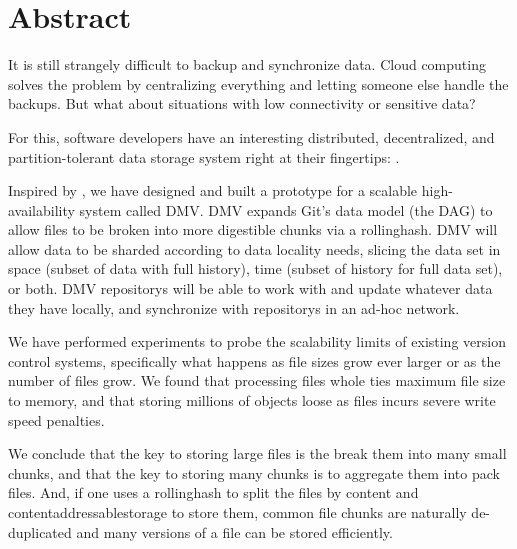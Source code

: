 \chapter{Abstract}

\glsunsetall
{}


It is still strangely difficult to backup and synchronize data. Cloud computing
solves the problem by centralizing everything and letting someone else handle
the backups. But what about situations with low connectivity or sensitive data?


For this, software developers have an interesting distributed, decentralized,
and partition-tolerant data storage system right at their fingertips:
.


Inspired by , we have designed and
built a prototype for a scalable high-availability system called \gls{DMV}.
\gls{DMV} expands Git's data model (the \acrshort{DAG}) to allow files to be
broken into more digestible chunks via a \gls{rollinghash}. \gls{DMV} will allow
data to be sharded according to data locality needs, slicing the data set in
space (subset of data with full history), time (subset of history for full data
set), or both. \gls{DMV} \glspl{repository} will be able to work with and update
whatever data they have locally, and synchronize with \glspl{repository} in an
ad-hoc network.


We have performed experiments to probe the scalability limits of existing
version control systems, specifically what happens as file sizes grow ever
larger or as the number of files grow. We found that processing files whole ties
maximum file size to memory, and that storing millions of objects loose as files
incurs severe write speed penalties.





We conclude that the key to storing large files is the break them into many
small chunks, and that the key to storing many chunks is to aggregate them into
pack files. And, if one uses a \gls{rollinghash} to split the files by content
and \gls{contentaddressablestorage} to store them, common file chunks are
naturally de-duplicated and many versions of a file can be stored efficiently.

%


\glsresetall
